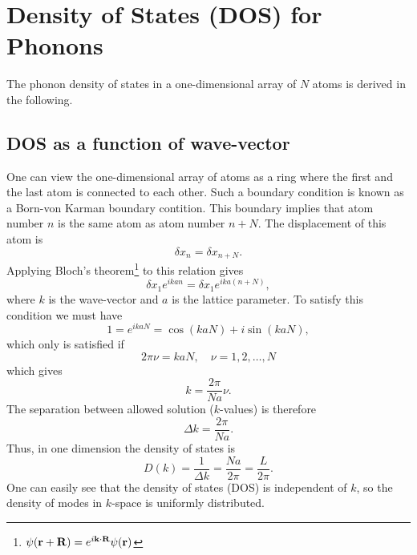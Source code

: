 \documentclass[11pt]{amsart}
\begin{document}

\setcounter{section}{1}
\section{Density of States (DOS) for Phonons}
The phonon density of states in a one-dimensional array of $N$ atoms is derived in the following.

\subsection{DOS as a function of wave-vector}
One can view the one-dimensional array of atoms as a ring where the first and the last atom is connected to each other. Such a boundary condition is known as a Born-von Karman boundary contition. This boundary implies that atom number $n$ is the same atom as atom number $n+N$.
The displacement of this atom is
\begin{equation*}
\delta x_n = \delta x_{n+N}.
\end{equation*}
Applying Bloch's theorem\footnote{$\psi(\vb{r}+\vb{R})=e^{i\vb{k}\cdot\vb{R}}\psi(\vb{r})$}
to this relation gives
\begin{equation*}
\delta x_1 e^{ikan} = \delta x_1 e^{ika(n+N)},
\end{equation*}
where $k$ is the wave-vector and $a$ is the lattice parameter. To satisfy this condition we must have
\begin{equation*}
1 = e^{ikaN} = \cos(kaN) + i\sin(kaN),
\end{equation*}
which only is satisfied if
\begin{equation*}
2\pi\nu = kaN, \quad \nu=1,2,\dots,N
\end{equation*}
which gives
\begin{equation*}
k = \frac{2\pi}{Na}\nu.
\end{equation*}
The separation between allowed solution ($k$-values) is therefore
\begin{equation}
\Delta k = \frac{2\pi}{Na}.
\end{equation}
Thus, in one dimension the density of states is
\begin{equation}
D(k) = \frac{1}{\Delta k} = \frac{Na}{2\pi} = \frac{L}{2\pi}.
\end{equation}
One can easily see that the density of states (DOS) is independent of $k$, so the density of modes in $k$-space is uniformly distributed.
\end{document}
